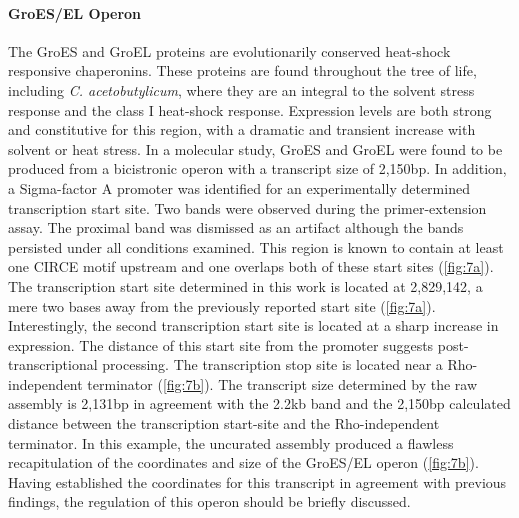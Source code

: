 \paragraph{GroES/EL Operon}
The GroES and GroEL proteins are evolutionarily conserved heat-shock responsive chaperonins. These proteins are found throughout the tree of life, including \textit{C. acetobutylicum}, where they are an integral to the solvent stress response\cite{74,75,76} and the class I heat-shock response\cite{42,74,75}. Expression levels are both strong and constitutive for this region, with a dramatic and transient increase with solvent or heat stress\cite{74,75}. In a molecular study, GroES and GroEL were found to be produced from a bicistronic operon with a transcript size of 2,150bp\cite{76}. In addition, a Sigma-factor A promoter was identified for an experimentally determined transcription start site. Two bands were observed during the primer-extension assay\cite{76}. The proximal band was dismissed as an artifact although the bands persisted under all conditions examined\cite{76}. This region is known to contain at least one CIRCE motif upstream\cite{77} and one overlaps both of these start sites (\ref{fig:7a})\cite{75}. The transcription start site determined in this work is located at 2,829,142, a mere two bases away from the previously reported start site\cite{76} (\ref{fig:7a}). Interestingly, the second transcription start site is located at a sharp increase in expression. The distance of this start site from the promoter suggests post-transcriptional processing. The transcription stop site is located near a Rho-independent terminator (\ref{fig:7b}). The transcript size determined by the raw assembly is 2,131bp in agreement with the 2.2kb band and the 2,150bp calculated distance between the transcription start-site and the Rho-independent terminator\cite{77}. In this example, the uncurated assembly produced a flawless recapitulation of the coordinates and size of the GroES/EL operon (\ref{fig:7b}). Having established the coordinates for this transcript in agreement with previous findings, the regulation of this operon should be briefly discussed.

